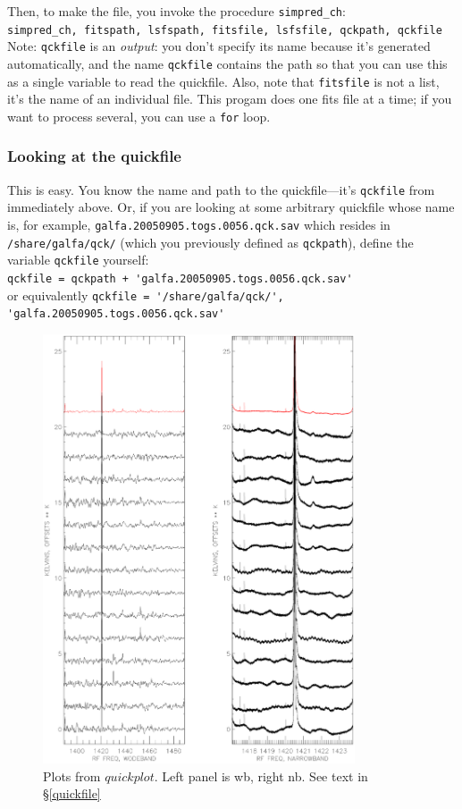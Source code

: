 \documentclass[psfig,preprint]{aastex}
\begin{document}
	Then, to make the file, you invoke the procedure
\verb$simpred_ch$: \\ 
\verb$simpred_ch, fitspath, lsfspath, fitsfile, lsfsfile, qckpath, qckfile$ \\
	Note: \verb$qckfile$ is an {\it output}: you don't specify its
name because it's generated automatically, and the name \verb$qckfile$
contains the path so that you can use this as a single variable to read the 
quickfile. Also, note that
\verb$fitsfile$ is not a list, it's the name of an individual file. This
progam does one fits file at a time; if you want to process several, you
can use a \verb$for$ loop. 

\subsubsection{Looking at the quickfile}

	This is easy. You know the name and path to the quickfile---it's
\verb$qckfile$ from immediately above. Or, if you are looking at some
arbitrary quickfile whose name is, for example,
\verb$galfa.20050905.togs.0056.qck.sav$ which resides in
\verb$/share/galfa/qck/$ (which you previously defined as \verb$qckpath$), 
define the variable \verb$qckfile$ yourself: \\
\verb$qckfile = qckpath + 'galfa.20050905.togs.0056.qck.sav'$ \\
or equivalently
\verb$qckfile = '/share/galfa/qck/', 'galfa.20050905.togs.0056.qck.sav'$ 

\begin{figure}[!h]
\begin{center}
\includegraphics[height=5in,width=7.in]{quickplot.ps}
\end{center}
\caption{Plots from $quickplot$. 
Left panel is wb, right nb. See text in \S \ref{quickfile}
\label{quickplotps}}
\end{figure}
\end{document}
